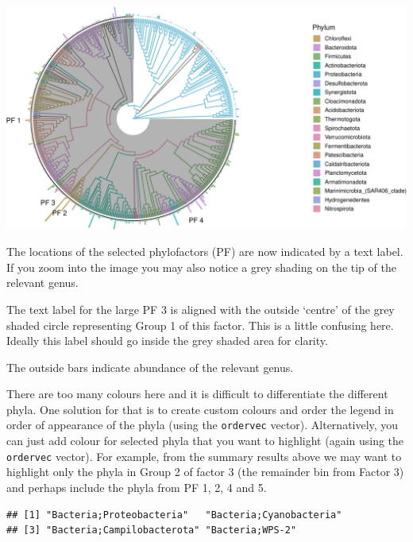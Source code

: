 \documentclass[
]{book}
\newenvironment{Shaded}{\begin{snugshade}}{\end{snugshade}}
\newcommand{\CommentTok}[1]{\textcolor[rgb]{0.56,0.35,0.01}{\textit{#1}}}
\newcommand{\NormalTok}[1]{#1}
\newcommand{\SpecialCharTok}[1]{\textcolor[rgb]{0.00,0.00,0.00}{#1}}
\begin{document}
\includegraphics{gitbook-demo_files/figure-latex/coloredtree-1.pdf}

The locations of the selected phylofactors (PF) are now indicated by a text label. If you zoom into the image you may also notice a grey shading on the tip of the relevant genus.

The text label for the large PF 3 is aligned with the outside `centre' of the grey shaded circle representing Group 1 of this factor. This is a little confusing here. Ideally this label should go inside the grey shaded area for clarity.

The outside bars indicate abundance of the relevant genus.

There are too many colours here and it is difficult to differentiate the different phyla. One solution for that is to create custom colours and order the legend in order of appearance of the phyla (using the \texttt{ordervec} vector). Alternatively, you can just add colour for selected phyla that you want to highlight (again using the \texttt{ordervec} vector). For example, from the summary results above we may want to highlight only the phyla in Group 2 of factor 3 (the remainder bin from Factor 3) and perhaps include the phyla from PF 1, 2, 4 and 5.

\begin{Shaded}
\end{Shaded}

\begin{verbatim}
## [1] "Bacteria;Proteobacteria"   "Bacteria;Cyanobacteria"   
## [3] "Bacteria;Campilobacterota" "Bacteria;WPS-2"
\end{verbatim}
\end{document}
